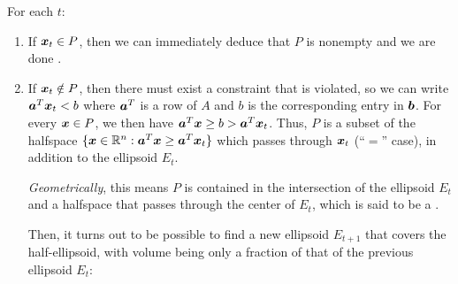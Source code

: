 \begin{enumerate}
For each \(t\):
\begin{enumerate}
\item If \(\bm{x}_t\in P\), then we can immediately deduce that \(P\) is
nonempty and we are done .
\item If \(\bm{x}_t\notin P\), then there must exist a constraint that is
violated, so we can write \(\bm{a}^{T}\bm{x}_t<b\) where \(\bm{a}^{T}\)
is a row of \(A\) and \(b\) is the corresponding entry in \(\bm{b}\).
For every \(\bm{x}\in P\), we then have \(\bm{a}^{T}\bm{x}\ge
b>\bm{a}^{T}\bm{x}_t\). Thus, \(P\) is a subset of the halfspace
\(\{\bm{x}\in\mathbb{R}^n:\bm{a}^{T}\bm{x}\ge\bm{a}^{T}\bm{x}_t\}\) which
passes through \(\bm{x}_t\) (``\(=\)'' case), in addition to the
ellipsoid \(E_t\).

\emph{Geometrically}, this means \(P\) is contained in the intersection of the
ellipsoid \(E_t\) and a halfspace that passes through the center of \(E_t\), 
which is said to be a .
\begin{center}
\end{center}
Then, it turns out to be possible to find a new ellipsoid \(E_{t+1}\) that
covers the half-ellipsoid, with volume being only a fraction of that of the
previous ellipsoid \(E_t\):
\begin{center}
\end{center}
\end{enumerate}
\end{enumerate}
